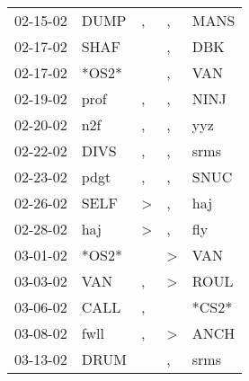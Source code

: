 \begin{supertabular}{p{0.07\textwidth}p{0.06\textwidth}p{0.02\textwidth}p{0.02\textwidth}p{0.06\textwidth}}
          02-15-02\textsuperscript{} &           DUMP\textsuperscript{} &                , &                , &           MANS\textsuperscript{} \\
          02-17-02\textsuperscript{} &           SHAF\textsuperscript{} &                  &                , &            DBK\textsuperscript{} \\
          02-17-02\textsuperscript{} &                            *OS2* &                  &                , &            VAN\textsuperscript{} \\
          02-19-02\textsuperscript{} &           prof\textsuperscript{} &                , &                , &           NINJ\textsuperscript{} \\
          02-20-02\textsuperscript{} &            n2f\textsuperscript{} &                , &                , &            yyz\textsuperscript{} \\
          02-22-02\textsuperscript{} &           DIVS\textsuperscript{} &                , &                , &           srms\textsuperscript{} \\
          02-23-02\textsuperscript{} &           pdgt\textsuperscript{} &                , &                , &           SNUC\textsuperscript{} \\
          02-26-02\textsuperscript{} &           SELF\textsuperscript{} &     \textgreater &                , &            haj\textsuperscript{} \\
          02-28-02\textsuperscript{} &            haj\textsuperscript{} &     \textgreater &                , &            fly\textsuperscript{} \\
          03-01-02\textsuperscript{} &                            *OS2* &                  &     \textgreater &            VAN\textsuperscript{} \\
          03-03-02\textsuperscript{} &            VAN\textsuperscript{} &                , &     \textgreater &           ROUL\textsuperscript{} \\
          03-06-02\textsuperscript{} &           CALL\textsuperscript{} &                , &                  &                            *CS2* \\
          03-08-02\textsuperscript{} &           fwll\textsuperscript{} &                , &     \textgreater &           ANCH\textsuperscript{} \\
          03-13-02\textsuperscript{} &           DRUM\textsuperscript{} &                  &                , &           srms\textsuperscript{} \\

\end{supertabular}
